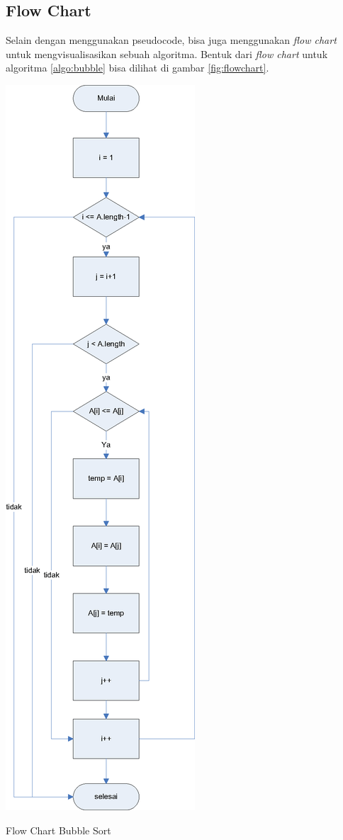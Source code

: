 \subsection{Flow Chart}
Selain dengan menggunakan pseudocode, bisa juga menggunakan \textit{flow chart} untuk mengvisualisasikan sebuah algoritma. Bentuk dari \textit{flow chart} untuk algoritma \ref{algo:bubble} bisa dilihat di gambar \ref{fig:flowchart}.

\begin{marginfigure}%
\includegraphics[scale=0.6]{fig/flowchart.eps}%
\caption{Flow Chart Bubble Sort}%
\label{fig:flowchart}%
\end{marginfigure}

